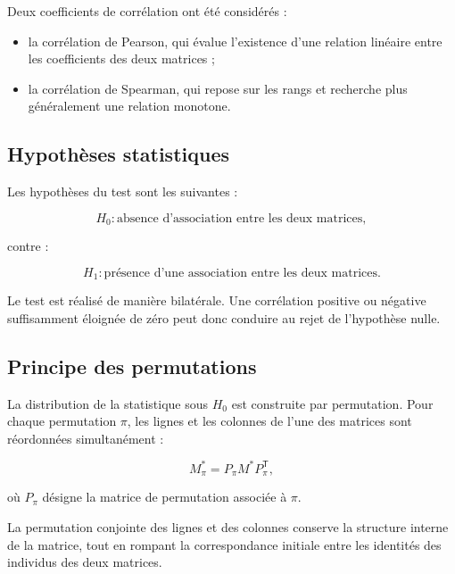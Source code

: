 \documentclass[11pt,a4paper]{report}
\begin{document}
Deux coefficients de corrélation ont été considérés :

\begin{itemize}
    \item la corrélation de Pearson, qui évalue l'existence d'une
    relation linéaire entre les coefficients des deux matrices ;
    \item la corrélation de Spearman, qui repose sur les rangs et
    recherche plus généralement une relation monotone.
\end{itemize}


\subsection{Hypothèses statistiques}

Les hypothèses du test sont les suivantes :

\begin{equation}
    H_0 :
    \text{absence d'association entre les deux matrices},
\end{equation}

contre :

\begin{equation}
    H_1 :
    \text{présence d'une association entre les deux matrices}.
\end{equation}

Le test est réalisé de manière bilatérale. Une corrélation positive ou
négative suffisamment éloignée de zéro peut donc conduire au rejet de
l'hypothèse nulle.


\subsection{Principe des permutations}

La distribution de la statistique sous $H_0$ est construite par
permutation. Pour chaque permutation $\pi$, les lignes et les colonnes
de l'une des matrices sont réordonnées simultanément :

\begin{equation}
    M^*_{\pi}
    =
    P_{\pi} M^* P_{\pi}^{\mathsf{T}},
\end{equation}

où $P_{\pi}$ désigne la matrice de permutation associée à $\pi$.

La permutation conjointe des lignes et des colonnes conserve la
structure interne de la matrice, tout en rompant la correspondance
initiale entre les identités des individus des deux matrices.
\end{document}
